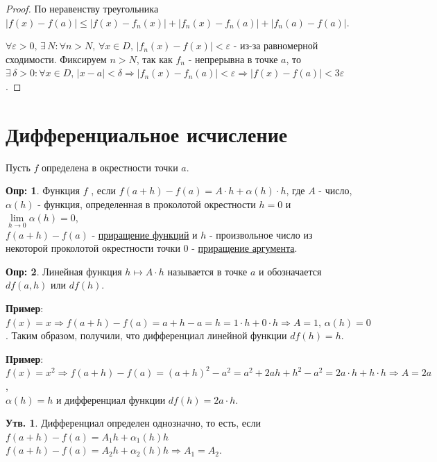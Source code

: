 \documentclass[12pt]{article}
\newcommand{\VE}{\varepsilon}
\theoremstyle{definition}
\newtheorem{defn}{Опр:}
\newtheorem{prop}{Утв.}
\begin{document}
\begin{proof}
	По неравенству треугольника $|f(x) - f(a)| \leq |f(x) - f_n(x)| + |f_n(x) - f_n(a)| + |f_n(a) - f(a)|$. 
	
	$\forall \VE > 0, \, \exists \, N \colon \forall n > N, \, \forall x \in D, \, |f_n(x) - f(x)| < \VE$ - из-за равномерной сходимости. Фиксируем $n > N$, так как $f_n$ - непрерывна в точке $a$, то $\exists \, \delta>0 \colon \forall x \in D, \, |x-a| < \delta \Rightarrow |f_n(x) - f_n(a)| < \VE \Rightarrow |f(x) - f(a)| < 3\VE$.
\end{proof}

\newpage

\section*{Дифференциальное исчисление}

Пусть $f$ определена в окрестности точки $a$.

\begin{defn}
	Функция $f$ , если $f(a+h) - f(a) = A{\cdot}h + \alpha(h){\cdot}h$, где $A$ - число, $\alpha(h)$ - функция, определенная в проколотой окрестности $h=0$ и $\lim\limits_{h \to 0} \alpha(h) = 0$, \\
	$f(a + h) - f(a)$ - \uline{приращение функций} и $h$ - произвольное число из некоторой проколотой окрестности точки $0$ - \uline{приращение аргумента}.
\end{defn}
\begin{defn}
	Линейная функция $h \mapsto A{\cdot}h$ называется  в точке $a$ и обозначается $df(a,h)$ или $df(h)$.
\end{defn}

\textbf{Пример}: $f(x) = x \Rightarrow f(a+h) - f(a) = a + h - a = h = 1{\cdot}h + 0{\cdot}h \Rightarrow A = 1, \, \alpha(h) = 0$. Таким образом, получили, что дифференциал линейной функции $df(h) = h$.

\textbf{Пример}: $f(x) = x^2 \Rightarrow f(a+h) - f(a) = (a + h)^2 - a^2 = a^2 + 2ah + h^2 - a^2 = 2a{\cdot}h + h{\cdot}h \Rightarrow A = 2a$,\\ 
$\alpha(h) = h$ и дифференциал функции $df(h) = 2a{\cdot}h$.

\begin{prop}
	Дифференциал определен однозначно, то есть, если $f(a+h) - f(a) = A_1h + \alpha_1(h)h$\\ 
	$f(a+h) - f(a) = A_2h + \alpha_2(h)h \Rightarrow A_1 = A_2$.
\end{prop}
\end{document}
